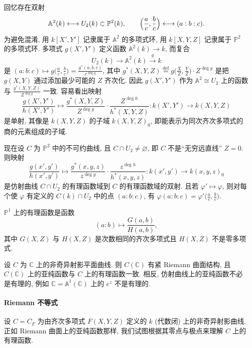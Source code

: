 \begin{remark} \label{thm:1.4.2} 
回忆存在双射
\[
\mathbb{A}^2(k) \longleftrightarrow U_2(k)\subset\mathbb{P}^2(k), \qquad
\Bigl(\frac{a}{c},\frac{b}{c}\Bigr)\longleftrightarrow(a:b:c).
\]
为避免混淆, 用 $k[X',Y']$ 记隶属于 $\mathbb{A}^2$ 的多项式环, 用 $k[X,Y,Z]$ 记隶属于 $\mathbb{P}^2$ 的多项式环. 多项式 $g(X',Y')$ 定义函数 $\mathbb{A}^2(k)\to k$, 而复合
\[
U_2(k)\to\mathbb{A}^2(k)\xrightarrow{g}k
\]
是 $(a:b:c)\mapsto g\bigl(\frac{a}{c},\frac{b}{c}\bigr) = \frac{g^*(a,b,c)}{c^{\deg g}}$, 其中 $g^*(X,Y,Z) \overset{\text{def}}{=} g\bigl(\frac{X}{Z},\frac{Y}{Z}\bigr)\cdot Z^{\deg g}$ 是把 $g(X,Y)$ 通过添加最少可能的 $Z$ 齐次化. 因此 $g(X',Y')$ 作为 $\mathbb{A}^2\cong U_2$ 上的函数与 $\frac{g^*(X,Y,Z)}{Z^{\deg g}}$ 一致. 容易看出映射
\[
\frac{g(X',Y')}{h(X',Y')}\mapsto\frac{g^*(X,Y,Z)}{Z^{\deg g}}\cdot\frac{Z^{\deg h}}{h^*(X,Y,Z)}\colon k(X',Y')\to k(X,Y,Z)
\]
是单射, 其像是 $k(X,Y,Z)$ 的子域 $k(X,Y,Z)_0$, 即能表示为同次齐次多项式的商的元素组成的子域.

现在设 $C$ 为 $\mathbb{P}^2$ 中的不可约曲线, 且 $C\cap U_2\neq\varnothing$, 即 $C$ 不是``无穷远直线'' $Z = 0$. 则映射
\[
\frac{g(x',y')}{h(x',y')}\mapsto\frac{g^*(x,y,z)}{z^{\deg g}}\cdot\frac{z^{\deg h}}{h^*(x,y,z)}\colon k(x',y')\to k(x,y,z)_0
\]
是仿射曲线 $C\cap U_2$ 的有理函数域到 $C$ 的有理函数域的双射. 且若 $\varphi'\mapsto\varphi$, 则对每个使 $\varphi$ 有定义的 $C(k)\cap U_2$ 中的点 $(a:b:c)$, 有 $\varphi(a:b:c) = \varphi'\bigl(\frac{a}{c},\frac{b}{c}\bigr)$.
\end{remark}

\begin{example} \label{thm:1.4.3} 
$\mathbb{P}^1$ 上的有理函数是函数
\[
(a:b)\mapsto\frac{G(a,b)}{H(a,b)},
\]
其中 $G(X,Z)$ 与 $H(X,Z)$ 是次数相同的齐次多项式且 $H(X,Z)$ 不是零多项式.
\end{example}

\begin{example} \label{thm:1.4.4} 
设 $C$ 为 $\mathbb{C}$ 上的非奇异射影平面曲线. 则 $C(\mathbb{C})$ 有紧 Riemann 曲面结构, 且 $C(\mathbb{C})$ 上的亚纯函数与 $C$ 上的有理函数一致. 相反, 仿射曲线上的亚纯函数不必是有理的, 例如 $\mathbb{C} = \mathbb{A}^1(\mathbb{C})$ 上的 $e^z$ 不是有理的.
\end{example}

\paragraph{Riemann 不等式}
设 $C = C_F$ 为由齐次多项式 $F(X,Y,Z)$ 定义的 $k$ (代数闭) 上的非奇异射影曲线. 正如 Riemann 曲面上的亚纯函数那样, 我们试图根据其零点与极点来理解 $C$ 上的有理函数.

